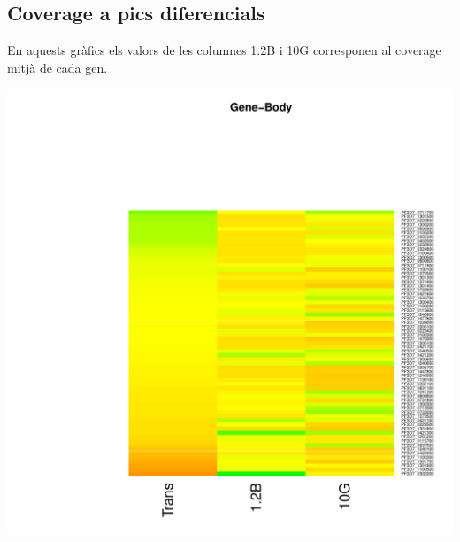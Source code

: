 \documentclass{article}\usepackage[]{graphicx}\usepackage[]{color}
\newenvironment{knitrout}{}{} %
\begin{document}
\subsection{Coverage a pics diferencials}
En aquests gràfics els valors de les columnes 1.2B i 10G corresponen al coverage mitjà de cada gen.
\begin{knitrout}
\color{fgcolor}

{\centering \includegraphics[width=.9\linewidth]{figure/minimal-heat_difpeak_cov-1} 

}



\end{knitrout}
\clearpage
\end{document}
